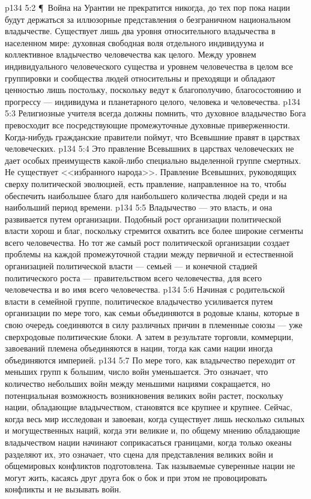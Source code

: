 \vs p134 5:2 \P\ Война на Урантии не прекратится никогда, до тех пор пока нации будут держаться за иллюзорные представления о безграничном национальном владычестве. Существует лишь два уровня относительного владычества в населенном мире: духовная свободная воля отдельного индивидуума и коллективное владычество человечества как целого. Между уровнем индивидуального человеческого существа и уровнем человечества в целом все группировки и сообщества людей относительны и преходящи и обладают ценностью лишь постольку, поскольку ведут к благополучию, благосостоянию и прогрессу --- индивидума и планетарного целого, человека и человечества.
\vs p134 5:3 Религиозные учителя всегда должны помнить, что духовное владычество Бога превосходит все посредствующие промежуточные духовные приверженности. Когда\hyp{}нибудь гражданские правители поймут, что Всевышние правят в царствах человеческих.
\vs p134 5:4 Это правление Всевышних в царствах человеческих не дает особых преимуществ какой\hyp{}либо специально выделенной группе смертных. Не существует <<избранного народа>>. Правление Всевышних, руководящих сверху политической эволюцией, есть правление, направленное на то, чтобы обеспечить наибольшее благо для наибольшего количества людей среди  и на наибольший период времени.
\vs p134 5:5 Владычество --- это власть, и она развивается путем организации. Подобный рост организации политической власти хорош и благ, поскольку стремится охватить все более широкие сегменты всего человечества. Но тот же самый рост политической организации создает проблемы на каждой промежуточной стадии между первичной и естественной организацией политической власти --- семьей --- и конечной стадией политического роста --- правительством всего человечества, для всего человечества и во имя всего человечества.
\vs p134 5:6 Начиная с родительской власти в семейной группе, политическое владычество усиливается путем организации по мере того, как семьи объединяются в родовые кланы, которые в свою очередь соединяются в силу различных причин в племенные союзы --- уже сверхродовые политические блоки. А затем в результате торговли, коммерции, завоеваний племена объединяются в нации, тогда как сами нации иногда объединяются империей.
\vs p134 5:7 По мере того, как владычество переходит от меньших групп к большим, число войн уменьшается. Это означает, что количество небольших войн между меньшими нациями сокращается, но потенциальная возможность возникновения великих войн растет, поскольку нации, обладающие владычеством, становятся все крупнее и крупнее. Сейчас, когда весь мир исследован и завоеван, когда существует лишь несколько сильных и могущественных наций, когда эти великие и, по общему мнению обладающие владычеством нации начинают соприкасаться границами, когда только океаны разделяют их, это означает, что сцена для представления великих войн и общемировых конфликтов подготовлена. Так называемые суверенные нации не могут жить, касаясь друг друга бок о бок и при этом не провоцировать конфликты и не вызывать войн.
